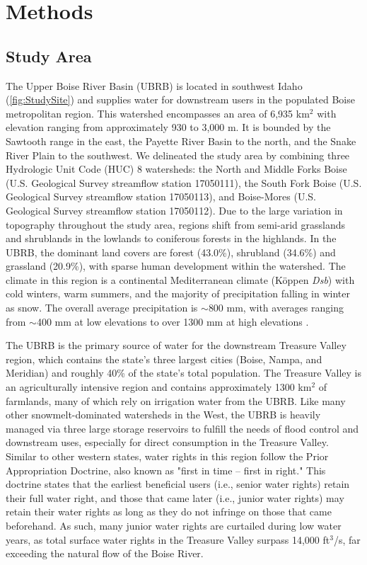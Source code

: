 \documentclass[water,article,submit,moreauthors,pdftex,10pt,a4paper]{mdpi}
\theoremstyle{mdpi}
\newcounter{ex}
\newcounter{re}
\theoremstyle{mdpidefinition}
\begin{document}
\section{Methods}
\subsection{Study Area}
The Upper Boise River Basin (UBRB) is located in southwest Idaho (\cref{fig:StudySite}) and supplies water for downstream users in the populated Boise metropolitan region. This watershed encompasses an area of 6,935 km${}^2$ with elevation ranging from approximately 930 to 3,000 m. It is bounded by the Sawtooth range in the east, the Payette River Basin to the north, and the Snake River Plain to the southwest. We delineated the study area by combining three Hydrologic Unit Code (HUC) 8 watersheds: the North and Middle Forks Boise (U.S. Geological Survey streamflow station 17050111), the South Fork Boise (U.S. Geological Survey streamflow station 17050113), and Boise-Mores (U.S. Geological Survey streamflow station 17050112). Due to the large variation in topography throughout the study area, regions shift from semi-arid grasslands and shrublands in the lowlands to coniferous forests in the highlands. In the UBRB, the dominant land covers are forest (43.0\%), shrubland (34.6\%) and grassland (20.9\%), with sparse human development within the watershed. The climate in this region is a continental Mediterranean climate (K\"{o}ppen \textit{Dsb}) with cold winters, warm summers, and the majority of precipitation falling in winter as snow. The overall average precipitation is $\sim$800 mm, with averages ranging from $\sim$400 mm at low elevations to over 1300 mm at high elevations \citep{Daly:2008hsa}.

The UBRB is the primary source of water for the downstream Treasure Valley region, which contains the state's three largest cities (Boise, Nampa, and Meridian) and roughly 40\% of the state's total population. The Treasure Valley is an agriculturally intensive region and contains approximately 1300 km${}^2$ of farmlands, many of which rely on irrigation water from the UBRB.  Like many other snowmelt-dominated watersheds in the West, the UBRB is heavily managed via three large storage reservoirs to fulfill the needs of flood control and downstream uses, especially for direct consumption in the Treasure Valley. Similar to other western states, water rights in this region follow the Prior Appropriation Doctrine, also known as "first in time – first in right." This doctrine states that the earliest beneficial users (i.e., senior water rights) retain their full water right, and those that came later (i.e., junior water rights) may retain their water rights as long as they do not infringe on those that came beforehand. As such, many junior water rights are curtailed during low water years, as total surface water rights in the Treasure Valley surpass 14,000 ft${}^3$/s, far exceeding the natural flow of the Boise River.
\end{document}
